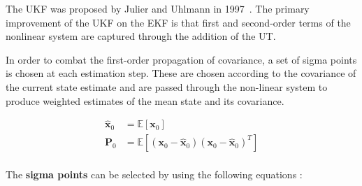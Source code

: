 The \gls{UKF} was proposed by Julier and Uhlmann in 1997~\cite{Julier1997}. The primary improvement of the \gls{UKF} on the \gls{EKF} is that first and second-order terms of the nonlinear system are captured through the
addition of the \gls{UT}.~\cite{Wan2000, Wan2001}  %

In order to combat the first-order propagation of covariance, a set of sigma
points is chosen at each estimation step. These are chosen according to the
covariance of the current state estimate and are passed through the non-linear
system to produce weighted estimates of the mean state and its covariance.

\begin{equation}
    \begin{aligned}
        \hat{\bm{x}}_0 &= \mathbb{E}[\bm{x}_0]                                             \\
        \bm{P}_0       &= \mathbb{E}[(\bm{x}_0-\hat{\bm{x}}_0)(\bm{x}_0-\hat{\bm{x}}_0)^T] \\
    \end{aligned}
\end{equation}


The \textbf{sigma points} can be selected by using the following equations \cite{Cheng2011}:


